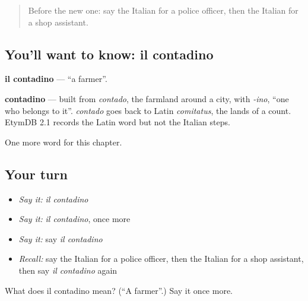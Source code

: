 \label{lesson:IT-C111-contadino}



\begin{quote}
Before the new one: say the Italian for a police officer, then the Italian for a shop assistant.
\end{quote}

\subsection*{You'll want to know: il contadino}
\textbf{il contadino} — \textquotedblleft{}a farmer\textquotedblright{}.

\begin{cousinweb}
\textbf{contadino} — built from \emph{contado}, the farmland around a city, with \emph{-ino}, \textquotedblleft{}one who belongs to it\textquotedblright{}. \emph{contado} goes back to Latin \emph{comitatus}, the lands of a count. EtymDB 2.1 records the Latin word but not the Italian steps.
\end{cousinweb}

\begin{grammarlens}[title={What you've built}]
One more word for this chapter.
\end{grammarlens}

\subsection*{Your turn}
\begin{itemize}
\raggedright
  \item \emph{Say it:} \emph{il contadino}
  \item \emph{Say it:} \emph{il contadino}, once more
  \item \emph{Say it:} say \emph{il contadino}
  \item \emph{Recall:} say the Italian for a police officer, then the Italian for a shop assistant, then say \emph{il contadino} again
\end{itemize}

\begin{tcolorbox}[breakable,colback=teal!4,colframe=teal!35!black,title={Before you move on}]
What does il contadino mean? (\textquotedblleft{}A farmer\textquotedblright{}.) Say it once more.
\end{tcolorbox}
